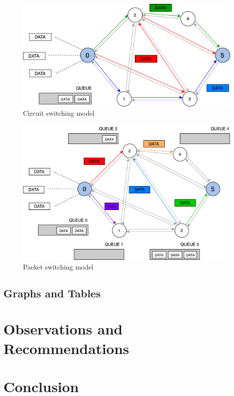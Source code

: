 \documentclass{article}
\begin{document}
    \begin{figure}[h]
  \centering
          \includegraphics[totalheight=5.5cm]{images/graph_cs.png}
  \renewcommand\figurename{Figure}
      \caption{Circuit switching model}
      \label{fig:graph_cs}
  \end{figure}

      \begin{figure}[h]
  \centering
          \includegraphics[totalheight=8cm]{images/graph_ps.png}
  \renewcommand\figurename{Figure}
      \caption{Packet switching model}
      \label{fig:graph_ps}
  \end{figure}
  

  \subsection{Graphs and Tables}



  \section{Observations and Recommendations}



  \section{Conclusion}
\end{document}
